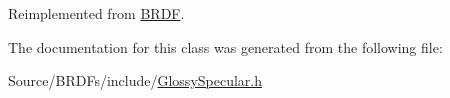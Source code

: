Reimplemented from \hyperlink{class_b_r_d_f_af3d87a4237b7b25b72ad1fb5027721bb}{B\+R\+DF}.



The documentation for this class was generated from the following file\+:\begin{DoxyCompactItemize}
\item 
Source/\+B\+R\+D\+Fs/include/\hyperlink{_glossy_specular_8h}{Glossy\+Specular.\+h}\end{DoxyCompactItemize}
